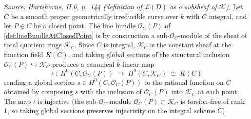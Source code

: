 \begin{definition}


  \label{def:lineBundleAtClosedPoint_toFunctionField}
  
  \textit{Source: Hartshorne, II.6, p.~144 (definition of \(\mathscr L(D)\)
  as a subsheaf of \(\mathscr K\)).}
  Let \(C\) be a smooth proper geometrically irreducible curve over \(\bar k\)
  with \(C\) integral, and let \(P \in C\) be a closed point. The line bundle
  \(\mathcal O_C(P)\) of \cref{def:lineBundleAtClosedPoint} is by
  construction a sub-\(\mathcal O_C\)-module of the sheaf of total quotient
  rings \(\mathcal K_C\). Since \(C\) is integral, \(\mathcal K_C\) is the
  constant sheaf at the function field \(K(C)\), and taking global sections
  of the structural inclusion \(\mathcal O_C(P) \hookrightarrow \mathcal K_C\)
  produces a canonical \(\bar k\)-linear map
  \[
    \iota \;\colon\; H^0(C, \mathcal O_C(P))
      \;\longrightarrow\; H^0(C, \mathcal K_C) \;\cong\; K(C)
  \]
  sending a global section \(s \in H^0(C, \mathcal O_C(P))\) to the rational
  function on \(C\) obtained by composing \(s\) with the inclusion of
  \(\mathcal O_C(P)\) into \(\mathcal K_C\) at each point. The map \(\iota\) is
  injective (the sub-\(\mathcal O_C\)-module $\mathcal O_C(P) \subset
  \mathcal K_C$ is torsion-free of rank $1$, so taking global sections
  preserves injectivity on the integral scheme \(C\)).


\end{definition}
